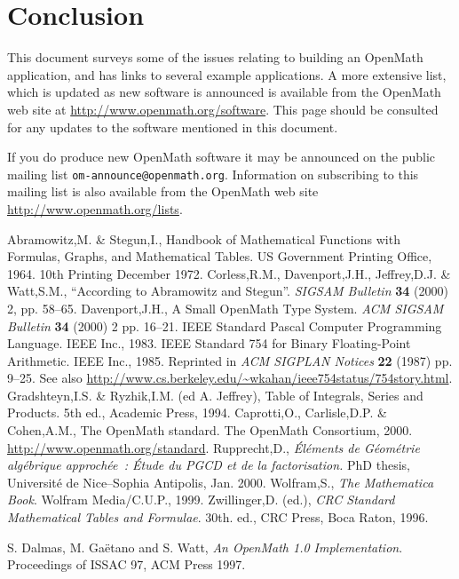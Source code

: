 \documentclass[keylogo]{openmath}
\begin{document}
\section{Conclusion}
This document surveys some of the issues relating to building an OpenMath
application, and has links to several example applications.
A more extensive list, which is updated as new software is announced
is available from the OpenMath web site at
\url{http://www.openmath.org/software}.
This page should be consulted for any updates to the software mentioned
in this document.

If you do produce new OpenMath software it may be announced on the
public mailing list \texttt{om-announce@openmath.org}. Information on
subscribing to this mailing list is also available from the OpenMath web site 
\url{http://www.openmath.org/lists}.

\let\oldsec\section
\def\section*{\oldsec}
\begin{thebibliography}{9}
Abramowitz,M. \& Stegun,I.,
Handbook of Mathematical Functions with Formulas, Graphs, and Mathematical
Tables.
US Government Printing Office, 1964.
10th Printing December 1972.
Corless,R.M., Davenport,J.H., Jeffrey,D.J. \& Watt,S.M.,
``According to Abramowitz and Stegun''.
{\it SIGSAM Bulletin\/} {\bf34} (2000) 2, pp. 58--65.
Davenport,J.H.,
A Small OpenMath Type System.
{\it ACM SIGSAM Bulletin\/} {\bf34} (2000) 2 pp. 16--21.
IEEE Standard Pascal Computer Programming Language.
IEEE Inc., 1983.
IEEE Standard 754 for Binary Floating-Point Arithmetic.
IEEE Inc., 1985.
Reprinted in {\it ACM SIGPLAN Notices\/} {\bf22} (1987) pp. 9--25.
See also
\url{http://www.cs.berkeley.edu/~wkahan/ieee754status/754story.html}.
Gradshteyn,I.S. \& Ryzhik,I.M. (ed A. Jeffrey),
Table of Integrals, Series and Products.
5th ed., Academic Press, 1994.
Caprotti,O., Carlisle,D.P. \& Cohen,A.M., The OpenMath
standard. The OpenMath Consortium, 2000.
\url{http://www.openmath.org/standard}.
Rupprecht,D.,
{\it \'El\'ements de G\'eom\'etrie alg\'ebrique approch\'ee~:
\'Etude du PGCD et de la factorisation.}
PhD thesis, Universit\'e de Nice--Sophia Antipolis, Jan. 2000.
Wolfram,S.,
{\it The Mathematica Book\/}.
Wolfram Media/C.U.P., 1999.
Zwillinger,D. (ed.),
{\it CRC Standard Mathematical Tables and Formulae\/}.
30th. ed., CRC Press, Boca Raton, 1996.

S. Dalmas, M. Ga{\"e}tano and S. Watt,
{\it An OpenMath 1.0 Implementation}.
Proceedings of ISSAC 97, ACM Press 1997.
\end{thebibliography}
\end{document}
